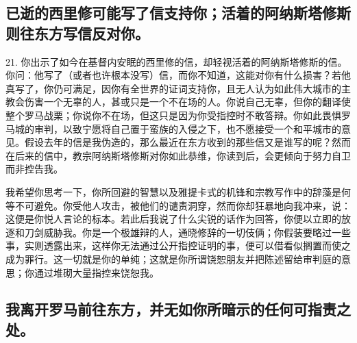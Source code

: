 
\subsection{已逝的西里修可能写了信支持你；活着的阿纳斯塔修斯则往东方写信反对你。}

21. 你出示了如今在基督内安眠的西里修的信，却轻视活着的阿纳斯塔修斯的信。你问：他写了（或者也许根本没写）信，而你不知道，这能对你有什么损害？若他真写了，你仍可满足，因你有全世界的证词支持你，且无人认为如此伟大城市的主教会伤害一个无辜的人，甚或只是一个不在场的人。你说自己无辜，但你的翻译使整个罗马战栗；你说你不在场，但这只是因为你受指控时不敢答辩。你如此畏惧罗马城的审判，以致宁愿将自己置于蛮族的入侵之下，也不愿接受一个和平城市的意见。假设去年的信是我伪造的，那么最近在东方收到的那些信又是谁写的呢？然而在后来的信中，教宗阿纳斯塔修斯对你如此恭维，你读到后，会更倾向于努力自卫而非控告我。\par

我希望你思考一下，你所回避的智慧以及雅提卡式的机锋和宗教写作中的辞藻是何等不可避免。你受他人攻击，被他们的谴责洞穿，然而你却狂暴地向我冲来，说： 这便是你悦人言论的标本。若此后我说了什么尖锐的话作为回答，你便以立即的放逐和刀剑威胁我。你是一个极雄辩的人，通晓修辞的一切伎俩；你假装要略过一些事，实则透露出来，这样你无法通过公开指控证明的事，便可以借看似搁置而使之成为罪行。这一切就是你的单纯；这就是你所谓饶恕朋友并把陈述留给审判庭的意思；你通过堆砌大量指控来饶恕我。\par


\subsection{我离开罗马前往东方，并无如你所暗示的任何可指责之处。}

